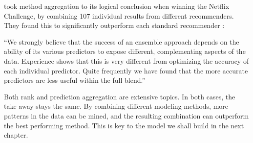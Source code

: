 \citeauthor{Bell2007} took method aggregation to its logical conclusion when winning the Netflix Challenge,
by combining 107 individual results from different recommenders.
They found this to significantly outperform each standard recommender \cite[p6]{Bell2007}:

\begin{blockquote}
``We strongly believe that the success of an ensemble approach depends on the ability of its various predictors to expose different, 
complementing aspects of the data. Experience shows that this is very different from optimizing the accuracy of each individual predictor. 
Quite frequently we have found that the more accurate predictors are less useful within the full blend.''
\end{blockquote}

Both rank and prediction aggregation are extensive topics.
In both cases, the take-away stays the same.
By combining different modeling methods,
more patterns in the data can be mined, and 
the resulting combination can outperform the best performing method.
This is key to the model we shall build in the next chapter.

